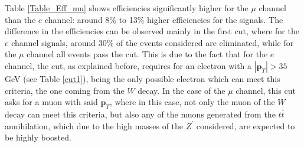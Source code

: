 \begin{table}[ht!]
\centering
\caption{Table of number of events ($\mathcal{N}$) of the seven cuts applied to the events for the $W^{\pm} \rightarrow \mu, \nu_{\mu}$ channel for high $Z^{\prime}$ masses.}
\label{Table_Num_mu}
\end{table}

\vspace{0.5cm}

Table \ref{Table_Eff_mu} shows efficiencies significantly higher for the $\mu$ channel than the $e$ channel: around 8\% to 13\% higher efficiencies for the signals. The difference in the efficiencies can be observed mainly in the first cut, where for the $e$ channel signals, around 30\% of the events considered are eliminated, while for the $\mu$ channel all events pass the cut. This is due to the fact that for the $e$ channel, the cut, as explained before, requires for an electron with a $|\bm{p}_T| > 35$ GeV (see Table \ref{cut1}), being the only possible electron which can meet this criteria, the one coming from the $W$ decay. In the case of the $\mu$ channel, this cut asks for a muon with said $\bm{p}_T$, where in this case, not only the muon of the $W$ decay can meet this criteria, but also any of the muons generated from the $t\overline t$ annihilation, which due to the high masses of the $Z^{\prime}$ considered, are expected to be highly boosted.

